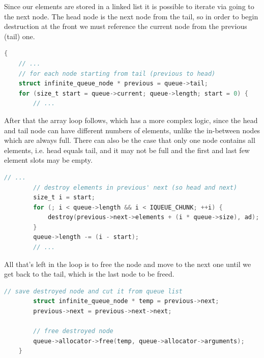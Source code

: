 Since our elements are stored in a linked list it is possible to iterate via going to the next node. The head node is the next node from the tail, so in order to begin destruction at the front we must reference the current node from the previous (tail) one.

\noindent
\begin{minipage}{\linewidth}
\begin{lstlisting}[language=C, style=CodeEditor, label=lst:destroy-queue-01, title=source/sequence/iqueue.c]
{
    // ...
    // for each node starting from tail (previous to head)
    struct infinite_queue_node * previous = queue->tail;
    for (size_t start = queue->current; queue->length; start = 0) {
        // ...
\end{lstlisting}
\end{minipage}

After that the array loop follows, which has a more complex logic, since the head and tail node can have different numbers of elements, unlike the in-between nodes which are always full. There can also be the case that only one node contains all elements, i.e. head equals tail, and it may not be full and the first and last few element slots may be empty.

\noindent
\begin{minipage}{\linewidth}
\begin{lstlisting}[language=C, style=CodeEditor, label=lst:destroy-queue-02, title=source/sequence/iqueue.c]
        // ...
        // destroy elements in previous' next (so head and next)
        size_t i = start;
        for (; i < queue->length && i < IQUEUE_CHUNK; ++i) {
            destroy(previous->next->elements + (i * queue->size), ad);
        }
        queue->length -= (i - start);
        // ...
\end{lstlisting}
\end{minipage}

All that's left in the loop is to free the node and move to the next one until we get back to the tail, which is the last node to be freed.

\noindent
\begin{minipage}{\linewidth}
\begin{lstlisting}[language=C, style=CodeEditor, label=lst:destroy-queue-03, title=source/sequence/iqueue.c]
        // save destroyed node and cut it from queue list
        struct infinite_queue_node * temp = previous->next;
        previous->next = previous->next->next;

        // free destroyed node
        queue->allocator->free(temp, queue->allocator->arguments);
    }
\end{lstlisting}
\end{minipage}

